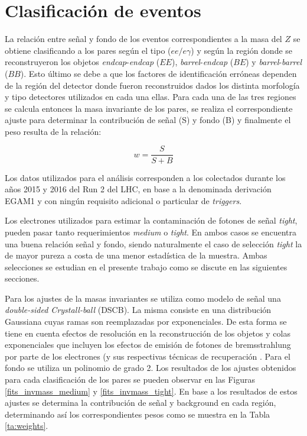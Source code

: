 \section{Clasificación de eventos}

La relación entre señal y fondo de los eventos correspondientes a la masa del $Z$ se obtiene clasificando a los pares según el tipo ($ee/e\gamma$) y según la región donde se reconstruyeron los objetos \textit{endcap}-\textit{endcap} ($EE$), \textit{barrel}-\textit{endcap} ($BE$) y \textit{barrel}-\textit{barrel} ($BB$). Esto último se debe a que los factores de identificación erróneas dependen de la región del detector donde fueron reconstruidos dados los distinta morfología y tipo detectores utilizados en cada una ellas. Para cada una de las tres regiones se calcula entonces la masa invariante de los pares, se realiza el correspondiente ajuste para determinar la contribución de señal (S) y fondo (B) y finalmente el peso resulta de la relación:

\begin{equation}
w=\frac{S}{S+B}
\label{eq:peso}
\end{equation}

Los datos utilizados para el análisis corresponden a los colectados durante los años 2015 y 2016 del Run 2 del LHC, en base a la denominada derivación EGAM1 y con ningún requisito adicional o particular de \textit{triggers}.

Los electrones utilizados para estimar la contaminación de fotones de señal \textit{tight}, pueden pasar tanto requerimientos  \textit{medium} o \textit{tight}. En ambos casos se encuentra una buena relación señal y fondo, siendo naturalmente el caso de selección \textit{tight} la de mayor pureza a costa de una menor estadística de la muestra. Ambas selecciones se estudian en el presente trabajo como se discute en las siguientes secciones.

Para los ajustes de la masas invariantes se utiliza como modelo de señal una \textit{double-sided Crystall-ball} (DSCB). La misma consiste en una distribución Gaussiana cuyas ramas son reemplazadas por exponenciales. De esta forma se tiene en cuenta efectos de resolución en la reconstrucción de los objetos y colas exponenciales que incluyen los efectos de emisión de fotones de bremsstrahlung por parte de los electrones (y sus respectivas técnicas de recuperación \cite{Kartvelishvili:2007zz}. Para el fondo se utiliza un polinomio de grado 2. Los resultados de los ajustes obtenidos para cada clasificación de los pares se pueden observar en las Figuras \ref{fits_invmass_medium} y \ref{fits_invmass_tight}. En base a los resultados de estos ajustes se determina la contribución de señal y background en cada región, determinando así los correspondientes pesos como se muestra en la Tabla \ref{ta:weights}.

